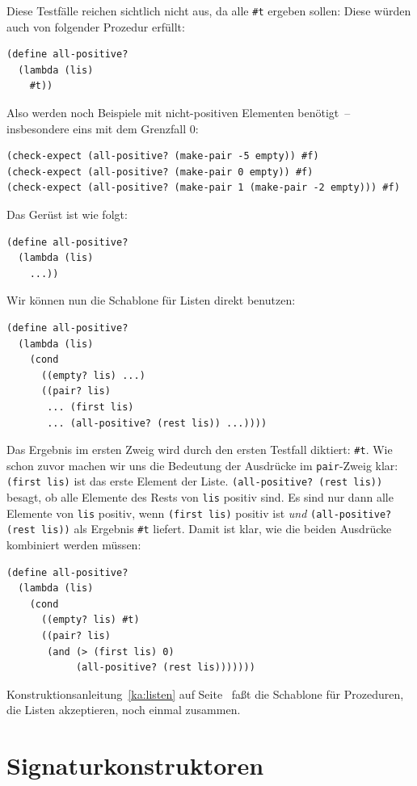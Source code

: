 Diese Testfälle reichen sichtlich nicht aus, da alle \verb|#t| ergeben
sollen: Diese würden auch von folgender Prozedur erfüllt:
%
\begin{verbatim}
(define all-positive?
  (lambda (lis)
    #t))
\end{verbatim}
%
Also werden noch Beispiele mit nicht-positiven Elementen benötigt~--
insbesondere eins mit dem Grenzfall $0$:
\begin{verbatim}
(check-expect (all-positive? (make-pair -5 empty)) #f)
(check-expect (all-positive? (make-pair 0 empty)) #f)
(check-expect (all-positive? (make-pair 1 (make-pair -2 empty))) #f)
\end{verbatim}
%
Das Gerüst ist wie folgt:
%
\begin{verbatim}
(define all-positive?
  (lambda (lis)
    ...))
\end{verbatim}
%
Wir können nun die Schablone für Listen direkt benutzen:
%
\begin{verbatim}
(define all-positive?
  (lambda (lis)
    (cond
      ((empty? lis) ...)
      ((pair? lis)
       ... (first lis)
       ... (all-positive? (rest lis)) ...))))
\end{verbatim}
%
Das Ergebnis im ersten Zweig wird durch den ersten Testfall diktiert:
\verb|#t|.  Wie schon zuvor machen wir uns die Bedeutung der
Ausdrücke im \texttt{pair}-Zweig klar:
\texttt{(first lis)} ist das erste Element der Liste.
\texttt{(all-positive? (rest lis))} besagt, ob alle Elemente
des Rests von \texttt{lis} positiv sind.  Es sind nur dann alle
Elemente von \texttt{lis} positiv, wenn \texttt{(first lis)}
positiv ist \emph{und} \texttt{(all-positive? (rest lis))} als Ergebnis
\verb|#t| liefert.  Damit ist klar, wie die beiden Ausdrücke
kombiniert werden müssen:
%
\begin{verbatim}
(define all-positive?
  (lambda (lis)
    (cond
      ((empty? lis) #t)
      ((pair? lis)
       (and (> (first lis) 0)
            (all-positive? (rest lis)))))))
\end{verbatim}
%
Konstruktionsanleitung~\ref{ka:listen} auf Seite~\pageref{ka:listen}
faßt die Schablone für Prozeduren, die Listen akzeptieren, noch einmal
zusammen.

\section{Signaturkonstruktoren}

